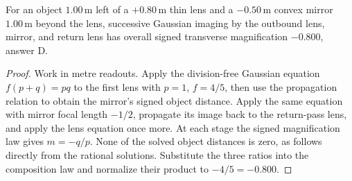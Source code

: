 \begin{theorem}
\label{thm:physics:phyx_mini_0030:target}
For an object \(1.00\,\mathrm m\) left of a \(+0.80\,\mathrm m\) thin lens
and a \(-0.50\,\mathrm m\) convex mirror \(1.00\,\mathrm m\) beyond the lens,
successive Gaussian imaging by the outbound lens, mirror, and return lens has
overall signed transverse magnification \(-0.800\), answer D.
\end{theorem}
\begin{proof}
Work in metre readouts.  Apply the division-free Gaussian equation
\(f(p+q)=pq\) to the first lens with \(p=1\), \(f=4/5\), then use the
propagation relation to obtain the mirror's signed object distance.  Apply the
same equation with mirror focal length \(-1/2\), propagate its image back to
the return-pass lens, and apply the lens equation once more.  At each stage
the signed magnification law gives \(m=-q/p\).  None of the solved object
distances is zero, as follows directly from the rational solutions.  Substitute
the three ratios into the composition law and normalize their product to
\(-4/5=-0.800\).
\end{proof}

